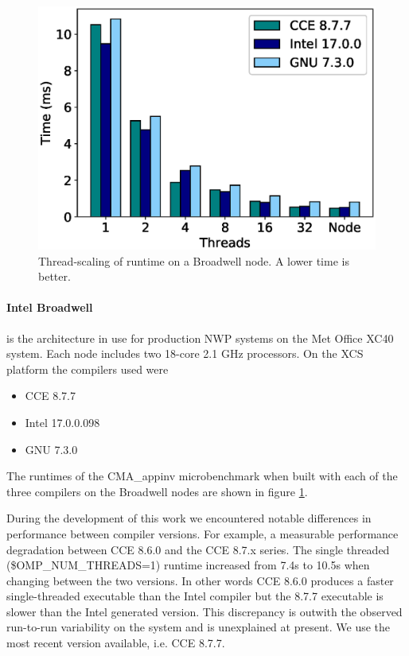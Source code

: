 \begin{figure}
\centering\includegraphics[scale=0.5]{figs/Broadwell_microbenchmark_vanilla.eps}
\caption{Thread-scaling of runtime on a Broadwell node. A lower time is better.}
\label{fig:cma_broadwell}
\end{figure}


\paragraph{Intel Broadwell} is the architecture in use for production NWP systems on the Met Office XC40 system.
Each node includes two 18-core 2.1 GHz processors.
On the XCS platform the compilers used were
\begin{itemize}
\item CCE 8.7.7
\item Intel 17.0.0.098
\item GNU 7.3.0
\end{itemize}

The runtimes of the CMA\_appinv microbenchmark when built with each of the three compilers on the Broadwell nodes are shown in figure \ref{fig:cma_broadwell}.

During the development of this work we encountered notable differences in performance between compiler versions.
For example, a measurable performance degradation between CCE 8.6.0 and the CCE 8.7.x series.
The single threaded (\$OMP\_NUM\_THREADS=1) runtime increased from 7.4s to 10.5s when changing between the two versions.
In other words CCE 8.6.0 produces a faster single-threaded executable than the Intel compiler but the 8.7.7 executable is slower than the Intel generated version.
This discrepancy is outwith the observed run-to-run variability on the system and is unexplained at present.
We use the most recent version available, i.e. CCE 8.7.7.

